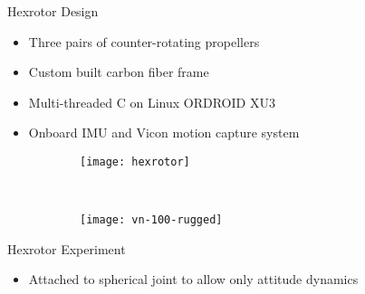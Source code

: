 \documentclass[11pt,professionalfonts]{beamer}
\begin{document}
\begin{frame}{Hexrotor Design} %
	\begin{itemize}
		\item Three pairs of counter-rotating propellers
		\item Custom built carbon fiber frame
		\item Multi-threaded C on Linux ORDROID XU3
		\item Onboard IMU and Vicon motion capture system
	\end{itemize}
	
	\begin{figure} 
		\centering 
		\begin{subfigure}[htbp]{0.5\textwidth} 
			\texttt{[image: hexrotor]} 
		\end{subfigure}~ %
		\begin{subfigure}[htbp]{0.5\textwidth} 
			\texttt{[image: vn-100-rugged]} 
		\end{subfigure}
	\end{figure}
\end{frame} %

\begin{frame}{Hexrotor Experiment} %
\begin{itemize}
	\item Attached to spherical joint to allow only attitude dynamics
\end{itemize}
\begin{figure}
\centering
{} 
\end{figure}
\end{frame}   %
\end{document}
